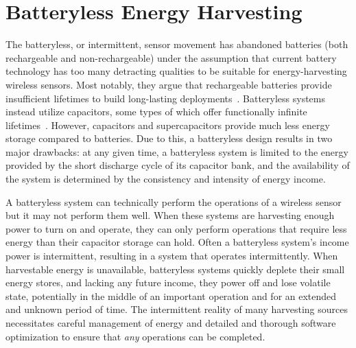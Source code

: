 \section{Batteryless Energy Harvesting}
\label{sec:background:batteryless}
The batteryless, or intermittent, sensor movement has abandoned batteries (both rechargeable and non-rechargeable) under the assumption that current battery technology has too many detracting qualities to be suitable for energy-harvesting wireless sensors.
Most notably, they argue that rechargeable batteries provide insufficient lifetimes to build long-lasting deployments~\cite{hesterTragedy15, hesterFlicker17, hesterTimely17, hester2017future, colinReconfigurable18, luciaIntermittent17, yervaGrafting12, majid2020continuous}.
Batteryless systems instead utilize capacitors, some types of which offer functionally infinite lifetimes~\cite{kemetLife}.
However, capacitors and supercapacitors provide much less energy storage compared to batteries.
Due to this, a batteryless design results in two major drawbacks:
at any given time, a batteryless system is limited to the energy provided by the short discharge cycle of its capacitor bank,
and the availability of the system is determined by the consistency and intensity of energy income.

A batteryless system can technically perform the operations of a wireless sensor but it may not perform them well.
When these systems are harvesting enough power to turn on and operate, they can only perform operations that require less energy than their capacitor storage can hold.
Often a batteryless system's income power is intermittent, resulting in a system that operates intermittently.
When harvestable energy is unavailable, batteryless systems quickly deplete their
small energy stores, and lacking any future income,
they power off and lose
volatile state, potentially in the middle of an important operation and for an extended and unknown period of time.
The intermittent reality of many harvesting sources necessitates careful management of energy
and detailed and thorough software optimization
to ensure that \textit{any} operations can be completed.

